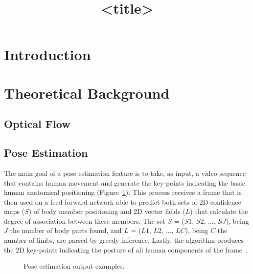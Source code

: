 \documentclass{article}
\title{<title>}
\begin{document}
\ninept
%
\maketitle
%
\begin{abstract}
\end{abstract}
%
\begin{keywords}
\end{keywords}
%
\section{Introduction}
\label{sec:intro}

\section{Theoretical Background}
\label{sec:back}

\subsection{Optical Flow}
\label{ssec:featSelection}

\subsection{Pose Estimation}
\label{ssec:featSelection}

The main goal of a pose estimation feature is to take, as input, a video sequence that contains human movement and generate the key-points indicating the basic human anatomical positioning (Figure~\ref{fig:pose}). This process receives a frame that is then used on a feed-forward network able to predict both sets of 2D confidence maps ($S$) of body member positioning and 2D vector fields ($L$) that calculate the degree of association between these members. The set $S$ = ($S1$, $S2$, ..., $SJ$), being $J$ the number of body parts found, and $L$ = ($L1$, $L2$, ..., $LC$), being $C$ the number of limbs, are parsed by greedy inference. Lastly, the algorithm produces the 2D key-points indicating the posture of all human components of the frame~\cite{cao2016realtime}.

\begin{figure}[!htb]
\centering
{} \hspace*{0.1cm}
 \hspace*{0.1cm}
\caption{Pose estimation output examples.}
\label{fig:pose}
\end{figure}
\end{document}
